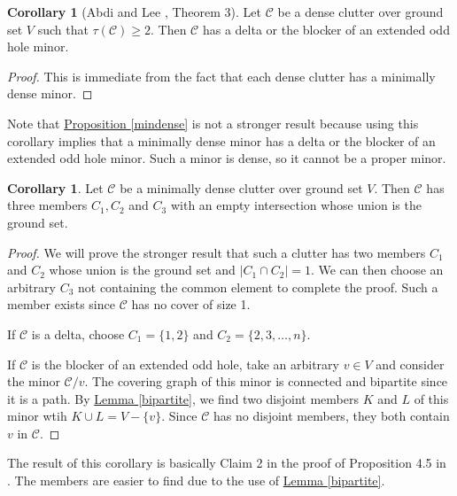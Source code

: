 \documentclass[a4paper, 12pt]{scrbook}
\theoremstyle{definition}
\newtheorem{corollary}[theorem]{Corollary}
\begin{document}
   \begin{corollary}[Abdi and Lee \cite{deltas}, Theorem 3]\label{findminor}
       Let $\mathcal{C}$ be a dense clutter over ground set $V$ such that $\tau(\mathcal{C}) \geq 2$.
       Then $\mathcal{C}$ has a delta or the blocker of an extended odd hole minor.
   \end{corollary}

   \begin{proof}
       This is immediate from the fact that each dense clutter has a minimally dense minor.
   \end{proof}

   Note that \hyperref[mindense]{Proposition \ref*{mindense}} is not a stronger result because using this corollary implies that a minimally dense minor has a delta or the blocker of an extended odd hole minor.
   Such a minor is dense, so it cannot be a proper minor.

   \begin{corollary}\label{threemember}
       Let $\mathcal{C}$ be a minimally dense clutter over ground set $V$.
       Then $\mathcal{C}$ has three members $C_1, C_2$ and $C_3$ with an empty intersection whose union is the ground set.
   \end{corollary}

   \begin{proof}
       We will prove the stronger result that such a clutter has two members $C_1$ and $C_2$ whose union is the ground set and $|C_1 \cap C_2|=1$.
       We can then choose an arbitrary $C_3$ not containing the common element to complete the proof.
       Such a member exists since $\mathcal{C}$ has no cover of size 1.

       If $\mathcal{C}$ is a delta, choose $C_1=\{1,2\}$ and $C_2=\{2,3,\ldots,n\}$.

       If $\mathcal{C}$ is the blocker of an extended odd hole, take an arbitrary $v \in V$ and consider the minor $\mathcal{C} / v$.
       The covering graph of this minor is connected and bipartite since it is a path.
       By \hyperref[bipartite]{Lemma \ref*{bipartite}}, we find two disjoint members $K$ and $L$ of this minor wtih $K \cup L = V-\{v\}$.
       Since $\mathcal{C}$ has no disjoint members, they both contain $v$ in $\mathcal{C}$.
   \end{proof}

   The result of this corollary is basically Claim 2 in the proof of Proposition 4.5 in \cite{restrictions}. The members are easier to find due to the use of \hyperref[bipartite]{Lemma \ref*{bipartite}}.
\end{document}
